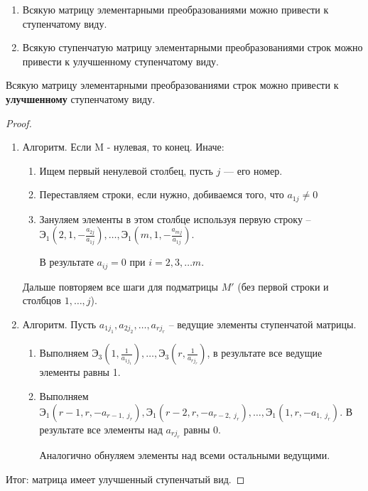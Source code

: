 \begin{theorem}
    \begin{enumerate}[label=\arabic*),nosep]
    \item Всякую матрицу элементарными преобразованиями можно привести к ступенчатому виду. 
    \item Всякую ступенчатую матрицу элементарными преобразованиями строк можно привести к улучшенному ступенчатому виду.
    \end{enumerate}
\end{theorem}

\begin{corollary}
    Всякую матрицу элементарными преобразованиями строк можно привести к \textbf{улучшенному} ступенчатому виду.
\end{corollary}

\begin{proof}~
    \begin{enumerate}
    \item
        Алгоритм. Если M - нулевая, то конец. Иначе:
        \begin{enumerate}[label=Шаг \arabic*:]
        \item Ищем первый ненулевой столбец, пусть $j$ --- его номер.
        \item Переставляем строки, если нужно, добиваемся того, что $a_{1j} \neq 0$
        \item 
            Зануляем элементы в этом столбце используя первую строку --  $\text{Э}_1(2, 1, -\frac{a_{2j}}{a_{1j}}), \dots, \text{Э}_1(m, 1, -\frac{a_{mj}}{a_{1j}})$.

            В результате $a_{ij} = 0$ при $i = 2, 3, \dots m$.
        \end{enumerate}
        Дальше повторяем все шаги для подматрицы $M'$ (без первой строки и столбцов $1, \dots, j$).
    \item 
        Алгоритм. Пусть $a_{1j_1}, a_{2j_2}, \dots, a_{rj_r}$ -- ведущие элементы ступенчатой матрицы.
        \begin{enumerate}[label=Шаг \arabic*:]
        \item Выполняем $\text{Э}_3(1, \frac{1}{a_{1j_1}}), \dots, \text{Э}_3(r, \frac{1}{a_{rj_r}})$, в результате все ведущие элементы равны 1.
        \item Выполняем $\text{Э}_1(r - 1, r, -a_{r - 1, \; j_r}), \text{Э}_1(r - 2, r, -a_{r - 2, \; j_r}), \dots, \text{Э}_1(1, r, -a_{1, \; j_r})$. В результате все элементы над $a_{r j_r}$ равны 0.
            
            Аналогично обнуляем элементы над всеми остальными ведущими.
        \end{enumerate}
    \end{enumerate}
    Итог: матрица имеет улучшенный ступенчатый вид.
\end{proof}


